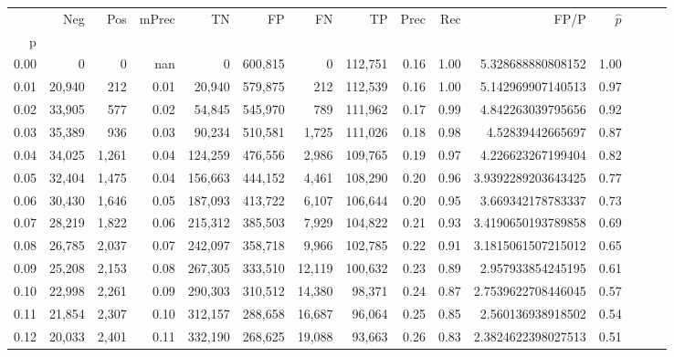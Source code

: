 \begin{tabular}{rrrrrrrrrrrrrrr}
\toprule
{} &     Neg &    Pos & mPrec &       TN &       FP &       FN &       TP &  Prec &   Rec &                    FP/P & $\hat{p}$ \\
p    &         &        &       &          &          &          &          &       &       &                         &           \\
\midrule
0.00 &       0 &      0 &   nan &        0 &  600,815 &        0 &  112,751 &  0.16 &  1.00 &       5.328688880808152 &      1.00 \\
0.01 &  20,940 &    212 &  0.01 &   20,940 &  579,875 &      212 &  112,539 &  0.16 &  1.00 &       5.142969907140513 &      0.97 \\
0.02 &  33,905 &    577 &  0.02 &   54,845 &  545,970 &      789 &  111,962 &  0.17 &  0.99 &       4.842263039795656 &      0.92 \\
0.03 &  35,389 &    936 &  0.03 &   90,234 &  510,581 &    1,725 &  111,026 &  0.18 &  0.98 &        4.52839442665697 &      0.87 \\
0.04 &  34,025 &  1,261 &  0.04 &  124,259 &  476,556 &    2,986 &  109,765 &  0.19 &  0.97 &       4.226623267199404 &      0.82 \\
0.05 &  32,404 &  1,475 &  0.04 &  156,663 &  444,152 &    4,461 &  108,290 &  0.20 &  0.96 &      3.9392289203643425 &      0.77 \\
0.06 &  30,430 &  1,646 &  0.05 &  187,093 &  413,722 &    6,107 &  106,644 &  0.20 &  0.95 &       3.669342178783337 &      0.73 \\
0.07 &  28,219 &  1,822 &  0.06 &  215,312 &  385,503 &    7,929 &  104,822 &  0.21 &  0.93 &      3.4190650193789858 &      0.69 \\
0.08 &  26,785 &  2,037 &  0.07 &  242,097 &  358,718 &    9,966 &  102,785 &  0.22 &  0.91 &      3.1815061507215012 &      0.65 \\
0.09 &  25,208 &  2,153 &  0.08 &  267,305 &  333,510 &   12,119 &  100,632 &  0.23 &  0.89 &       2.957933854245195 &      0.61 \\
0.10 &  22,998 &  2,261 &  0.09 &  290,303 &  310,512 &   14,380 &   98,371 &  0.24 &  0.87 &      2.7539622708446045 &      0.57 \\
0.11 &  21,854 &  2,307 &  0.10 &  312,157 &  288,658 &   16,687 &   96,064 &  0.25 &  0.85 &       2.560136938918502 &      0.54 \\
0.12 &  20,033 &  2,401 &  0.11 &  332,190 &  268,625 &   19,088 &   93,663 &  0.26 &  0.83 &      2.3824622398027513 &      0.51 \\

\end{tabular}
